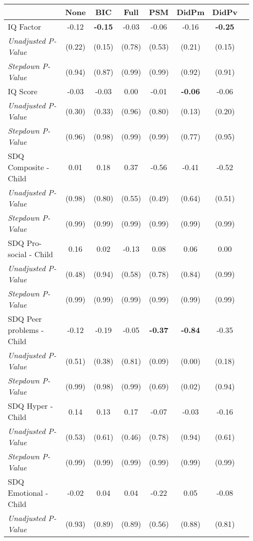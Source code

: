 \begin{tabular}{l c c c c c c c}
\toprule
 & None & BIC & Full & PSM & DidPm & DidPv \\
\midrule
IQ Factor & -0.12 & \textbf{ -0.15 } & -0.03 & -0.06 & -0.16 & \textbf{ -0.25 } \\
\quad \textit{Unadjusted P-Value} & (0.22) & (0.15) & (0.78) & (0.53) & (0.21) & (0.15) \\
\quad \textit{Stepdown P-Value} & (0.94) & (0.87) & (0.99) & (0.99) & (0.92) & (0.91) \\
IQ Score & -0.03 & -0.03 & 0.00 & -0.01 & \textbf{ -0.06 } & -0.06 \\
\quad \textit{Unadjusted P-Value} & (0.30) & (0.33) & (0.96) & (0.80) & (0.13) & (0.20) \\
\quad \textit{Stepdown P-Value} & (0.96) & (0.98) & (0.99) & (0.99) & (0.77) & (0.95) \\
SDQ Composite - Child & 0.01 & 0.18 & 0.37 & -0.56 & -0.41 & -0.52 \\
\quad \textit{Unadjusted P-Value} & (0.98) & (0.80) & (0.55) & (0.49) & (0.64) & (0.51) \\
\quad \textit{Stepdown P-Value} & (0.99) & (0.99) & (0.99) & (0.99) & (0.99) & (0.99) \\
SDQ Pro-social - Child & 0.16 & 0.02 & -0.13 & 0.08 & 0.06 & 0.00 \\
\quad \textit{Unadjusted P-Value} & (0.48) & (0.94) & (0.58) & (0.78) & (0.84) & (0.99) \\
\quad \textit{Stepdown P-Value} & (0.99) & (0.99) & (0.99) & (0.99) & (0.99) & (0.99) \\
SDQ Peer problems - Child & -0.12 & -0.19 & -0.05 & \textbf{ -0.37 } & \textbf{ -0.84 } & -0.35 \\
\quad \textit{Unadjusted P-Value} & (0.51) & (0.38) & (0.81) & (0.09) & (0.00) & (0.18) \\
\quad \textit{Stepdown P-Value} & (0.99) & (0.98) & (0.99) & (0.69) & (0.02) & (0.94) \\
SDQ Hyper - Child & 0.14 & 0.13 & 0.17 & -0.07 & -0.03 & -0.16 \\
\quad \textit{Unadjusted P-Value} & (0.53) & (0.61) & (0.46) & (0.78) & (0.94) & (0.61) \\
\quad \textit{Stepdown P-Value} & (0.99) & (0.99) & (0.99) & (0.99) & (0.99) & (0.99) \\
SDQ Emotional - Child & -0.02 & 0.04 & 0.04 & -0.22 & 0.05 & -0.08 \\
\quad \textit{Unadjusted P-Value} & (0.93) & (0.89) & (0.89) & (0.56) & (0.88) & (0.81) \\

\end{tabular}

